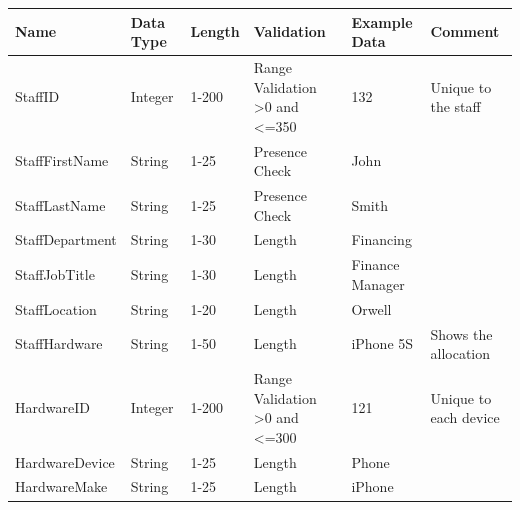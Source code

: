 \begin{center}
\begin{longtable}{|p{4cm}|p{1.3cm}|p{1.1cm}|p{1.7cm}|p{1.7cm}|p{2cm}|}
\hline
\textbf{Name} & \textbf{Data Type}& \textbf{Length} & \textbf{Validation} & \textbf{Example Data} & \textbf{Comment}      \\ \hline
StaffID                             & Integer                                 & 1-200                     & Range Validation \textgreater0 and \textless=350                                 & 132                   & Unique to the staff   \\ \hline
StaffFirstName                      & String                                  & 1-25                                 & Presence Check                           & John                  &                       \\ \hline
StaffLastName                       & String                                  & 1-25                                 & Presence Check                           & Smith                 &                       \\ \hline
StaffDepartment                     & String                                  & 1-30                                 & Length                                   & Financing             &                       \\ \hline
StaffJobTitle			& String				& 1-30			& Length			& Finance Manager		&		\\ \hline
StaffLocation                       & String                                  & 1-20                                 & Length                                   & Orwell                &                       \\ \hline
StaffHardware	& String				&1-50				& Length				& iPhone 5S         & Shows the allocation          \\ \hline 
HardwareID                          & Integer                                 & 1-200                                & Range Validation \textgreater0 and  \textless=300                      & 121                   & Unique to each device \\ \hline
HardwareDevice                      & String                                  & 1-25                                 & Length                                   & Phone                 &                       \\ \hline
HardwareMake                        & String                                  & 1-25                                 & Length                                   & iPhone                &                       \\ \hline

\end{longtable}
\end{center}

